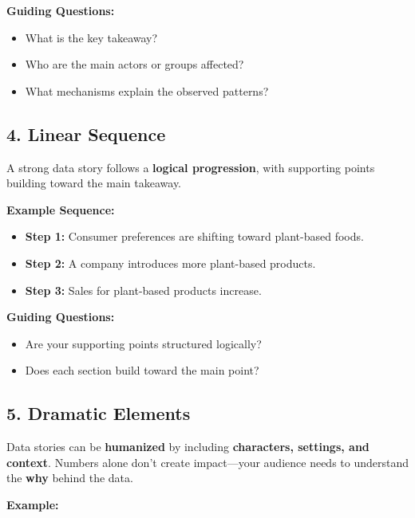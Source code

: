 \documentclass[
  11pt,
]{article}
\providecommand{\tightlist}{%
  \setlength{\itemsep}{0pt}\setlength{\parskip}{0pt}}
\begin{document}
\textbf{Guiding Questions:}

\begin{itemize}
\tightlist
\item
  What is the key takeaway?
\item
  Who are the main actors or groups affected?
\item
  What mechanisms explain the observed patterns?
\end{itemize}

\subsection{\texorpdfstring{\textbf{4. Linear
Sequence}}{4. Linear Sequence}}\label{linear-sequence}

A strong data story follows a \textbf{logical progression}, with
supporting points building toward the main takeaway.

\textbf{Example Sequence:}

\begin{itemize}
\tightlist
\item
  \textbf{Step 1:} Consumer preferences are shifting toward plant-based
  foods.\\
\item
  \textbf{Step 2:} A company introduces more plant-based products.\\
\item
  \textbf{Step 3:} Sales for plant-based products increase.
\end{itemize}

\textbf{Guiding Questions:}

\begin{itemize}
\tightlist
\item
  Are your supporting points structured logically?
\item
  Does each section build toward the main point?
\end{itemize}

\subsection{\texorpdfstring{\textbf{5. Dramatic
Elements}}{5. Dramatic Elements}}\label{dramatic-elements}

Data stories can be \textbf{humanized} by including \textbf{characters,
settings, and context}. Numbers alone don't create impact---your
audience needs to understand the \textbf{why} behind the data.

\textbf{Example:}
\end{document}
